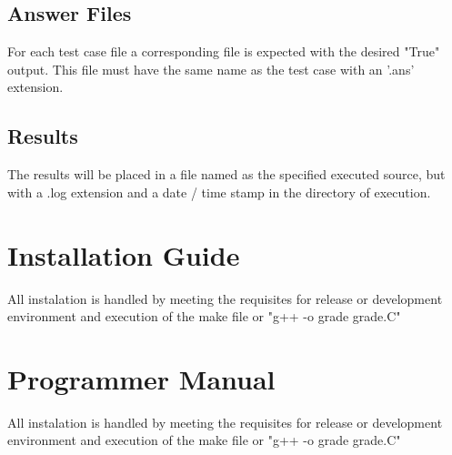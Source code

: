 \subsection{Answer Files}
For each test case file a corresponding file is expected with the desired "True" output. This file must have the same name as the test case with an '.ans' extension.

\subsection{Results}
The results will be placed in a file named as the specified executed source, but with a .log extension and a date / time stamp in the directory of execution.

\section{Installation Guide}
All instalation is handled by meeting the requisites for release or development environment and execution of the make file or "g++ -o grade grade.C"

\section{Programmer Manual}
All instalation is handled by meeting the requisites for release or development environment and execution of the make file or "g++ -o grade grade.C"


